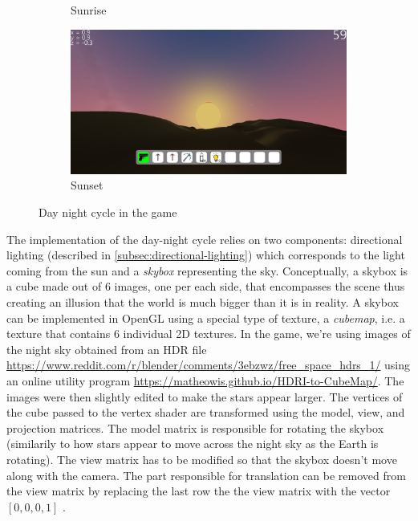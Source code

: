 \begin{figure}[h]
\begin{subfigure}[b]{0.475\textwidth}
        \caption[]%
        {{\small Sunrise}}
        \label{fig:cycle-sunrise}
    \end{subfigure}
    \hfill
    \begin{subfigure}[b]{0.475\textwidth}
        \centering
        \includegraphics[width=\textwidth]{chapters/lighting/sections/environment/resources/sunset.png}
        \caption[]%
        {{\small Sunset}}
        \label{fig:cycle-sunset}
    \end{subfigure}
    \caption[]
    {\small Day night cycle in the game}
    \label{fig:cycle}
\end{figure}

The implementation of the day-night cycle relies on two components: directional lighting (described in \autoref{subsec:directional-lighting}) which corresponds to the light coming from the sun and a \textit{skybox} representing the sky.
Conceptually, a skybox is a cube made out of 6 images, one per each side, that encompasses the scene thus creating an illusion that the world is much bigger than it is in reality.
A skybox can be implemented in OpenGL using a special type of texture, a \textit{cubemap}, i.e. a texture that contains 6 individual 2D textures.
In the game, we're using images of the night sky obtained from an HDR file \url{https://www.reddit.com/r/blender/comments/3ebzwz/free_space_hdrs_1/} using an online utility program \url{https://matheowis.github.io/HDRI-to-CubeMap/}.
The images were then slightly edited to make the stars appear larger.
The vertices of the cube passed to the vertex shader are transformed using the model, view, and projection matrices.
The model matrix is responsible for rotating the skybox (similarily to how stars appear to move across the night sky as the Earth is rotating).
The view matrix has to be modified so that the skybox doesn't move along with the camera.
The part responsible for translation can be removed from the view matrix by replacing the last row the the view matrix with the vector $[0, 0, 0, 1]$ \cite{LearnOpenGL-Cubemaps}.

